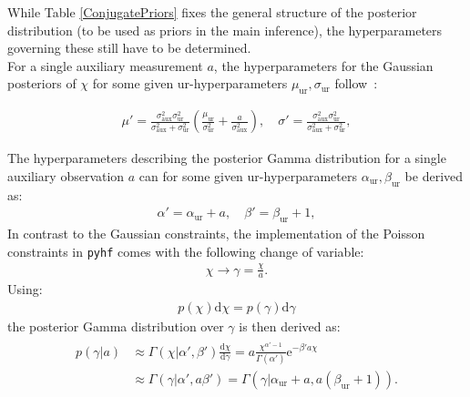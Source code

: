 \noindent While Table \ref{ConjugatePriors} fixes the general structure of the posterior distribution (to be used as priors in the main inference), the hyperparameters governing these still have to be determined. \\
For a single auxiliary measurement $a$, the hyperparameters for the Gaussian posteriors of $\chi$ for some given ur-hyperparameters $\mu_{\text{ur}}, \sigma_{\text{ur}}$ follow~\cite{Murphy2007}:

    \begin{align} \label{BayesConj}
        \mu'= \frac{\sigma_{\text{aux}}^2 \sigma_{\text{ur}}^2}{\sigma_{\text{aux}}^2 + \sigma_{\text{ur}}^2} \left( \frac{\mu_{\text{ur}}}{\sigma_{\text{ur}}^2} + \frac{a}{\sigma_{\text{aux}}^2}\right) , \quad \sigma' = \frac{\sigma_{\text{aux}}^2 \sigma_{\text{ur}}^2}{\sigma_{\text{aux}}^2 + \sigma_{\text{ur}}^2},
    \end{align}

\noindent The hyperparameters describing the posterior Gamma distribution for a single auxiliary observation $a$ can for some given ur-hyperparameters $\alpha_{\text{ur}}, \beta_{\text{ur}}$ be derived as:
    \begin{align} \label{PoissonUpdating}
        \alpha' = \alpha_{\text{ur}} + a, \quad \beta' = \beta_{\text{ur}} + 1,
    \end{align}
\noindent In contrast to the Gaussian constraints, the implementation of the Poisson constraints in \texttt{pyhf} comes with the following change of variable:
    \begin{align} \label{}
        \chi  \rightarrow \gamma = \frac{\chi}{a}.
    \end{align}
\noindent Using:
    \begin{align}
        p(\chi) \mathrm{d} \chi = p(\gamma) \mathrm{d} \gamma
    \end{align}
\noindent the posterior Gamma distribution over $\gamma$ is then derived as:
    \begin{align}
    \begin{split}
        p(\gamma | a ) &\approx \Gamma(\chi | \alpha', \beta') \frac{\mathrm{d} \chi}{\mathrm{d} \gamma} = a \frac{\chi^{\alpha'-1}}{\Gamma(\alpha')} \text{e}^{-\beta' a \chi} \\
        &\approx \Gamma(\gamma | \alpha', a\beta') = \Gamma(\gamma | \alpha_{\text{ur}} + a, a(\beta_{\text{ur}} + 1)).
    \end{split}
    \end{align}

